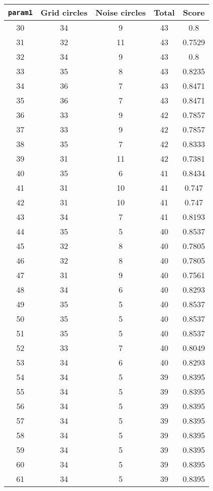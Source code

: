 \documentclass[letterpaper, 12pt]{article}
\begin{document}
\begin{longtable}{|c|c|c|c|c|}
\hline
\textbf{\texttt{param1}} & \textbf{Grid circles} & \textbf{Noise circles} & \textbf{Total} & \textbf{Score} \\
\hline
30 & 34 & 9 & 43 & 0.8 \\
\hline
31 & 32 & 11 & 43 & 0.7529 \\
\hline
32 & 34 & 9 & 43 & 0.8 \\
\hline
33 & 35 & 8 & 43 & 0.8235 \\
\hline
34 & 36 & 7 & 43 & 0.8471 \\
\hline
35 & 36 & 7 & 43 & 0.8471 \\
\hline
36 & 33 & 9 & 42 & 0.7857 \\
\hline
37 & 33 & 9 & 42 & 0.7857 \\
\hline
38 & 35 & 7 & 42 & 0.8333 \\
\hline
39 & 31 & 11 & 42 & 0.7381 \\
\hline
40 & 35 & 6 & 41 & 0.8434 \\
\hline
41 & 31 & 10 & 41 & 0.747 \\
\hline
42 & 31 & 10 & 41 & 0.747 \\
\hline
43 & 34 & 7 & 41 & 0.8193 \\
\hline
44 & 35 & 5 & 40 & 0.8537 \\
\hline
45 & 32 & 8 & 40 & 0.7805 \\
\hline
46 & 32 & 8 & 40 & 0.7805 \\
\hline
47 & 31 & 9 & 40 & 0.7561 \\
\hline
48 & 34 & 6 & 40 & 0.8293 \\
\hline
49 & 35 & 5 & 40 & 0.8537 \\
\hline
50 & 35 & 5 & 40 & 0.8537 \\
\hline
51 & 35 & 5 & 40 & 0.8537 \\
\hline
52 & 33 & 7 & 40 & 0.8049 \\
\hline
53 & 34 & 6 & 40 & 0.8293 \\
\hline
54 & 34 & 5 & 39 & 0.8395 \\
\hline
55 & 34 & 5 & 39 & 0.8395 \\
\hline
56 & 34 & 5 & 39 & 0.8395 \\
\hline
57 & 34 & 5 & 39 & 0.8395 \\
\hline
58 & 34 & 5 & 39 & 0.8395 \\
\hline
59 & 34 & 5 & 39 & 0.8395 \\
\hline
60 & 34 & 5 & 39 & 0.8395 \\
\hline
61 & 34 & 5 & 39 & 0.8395 \\

\end{longtable}
\end{document}
